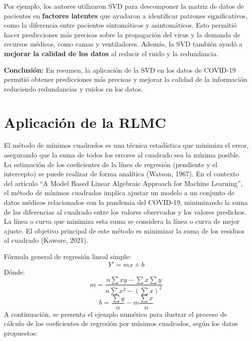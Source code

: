 \documentclass[12pt]{article}
\begin{document}
        Por ejemplo, los autores utilizaron SVD para descomponer la matriz de datos de pacientes en \textbf{factores latentes} que ayudaron a identificar patrones significativos, como la diferencia entre pacientes sintomáticos y asintomáticos. Esto permitió hacer predicciones más precisas sobre la propagación del virus y la demanda de recursos médicos, como camas y ventiladores. Además, la SVD también ayudó a \textbf{mejorar la calidad de los datos} al reducir el ruido y la redundancia.
        
        \noindent
        \textbf{Conclusión:} En resumen, la aplicación de la SVD en los datos de COVID-19 permitió obtener predicciones más precisas y mejorar la calidad de la información reduciendo redundancias y ruidos en los datos.
        
        \section*{Aplicación de la RLMC}
        \noindent
        El método de mínimos cuadrados es una técnica estadística que minimiza el error, asegurando que la suma de todos los errores al cuadrado sea la mínima posible. La estimación de los coeficientes de la línea de regresión (pendiente y el intercepto) se puede realizar de forma analítica (Watson, 1967). En el contexto del artículo “A Model Based Linear Algebraic Approach for Machine Learning”, el método de mínimos cuadrados implica ajustar un modelo a un conjunto de datos médicos relacionados con la pandemia del COVID-19, minimizando la suma de las diferencias al cuadrado entre los valores observados y los valores predichos. La línea o curva que minimiza esta suma se considera la línea o curva de mejor ajuste. El objetivo principal de este método es minimizar la suma de los residuos al cuadrado (Kaware, 2021).
        
        \vspace{0.5em}
        \noindent
        Fórmula general de regresión lineal simple:
        \[
         Y' = mx + b 
        \]
        \noindent
        Dónde:
        \[
        m = \frac{n \sum xy - \sum x \sum y}{n \sum x^{2} - (\sum x)^2}
        \]
        \[
        b = \frac{\sum y}{n} - m \frac{\sum x}{n}
        \]
        \noindent
        A continuación, se presenta el ejemplo numérico para ilustrar el proceso de cálculo de los coeficientes de regresión por mínimos cuadrados, según los datos propuestos:
        
\end{document}
